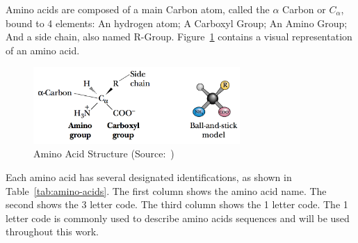 Amino acids are composed of a main Carbon atom, called the $\alpha$ Carbon
or $C_\alpha$, bound to 4 elements: An hydrogen atom; A Carboxyl Group; An
Amino Group; And a side chain, also named R-Group.
Figure~\ref{fig:amino-acid-structure} contains a visual representation of
an amino acid.

\begin{figure}
    \centering
    \includegraphics[width=0.7\textwidth]{Figuras/amino-acid.png}
    \caption{Amino Acid Structure (Source:~\cite{garrett1999biochemistry})}
    \label{fig:amino-acid-structure}
\end{figure}

Each amino acid has several designated identifications, as shown in
Table~\ref{tab:amino-acids}. The first column shows the amino acid name.
The second shows the 3 letter code. The third column shows the 1 letter code.
The 1 letter code is commonly used to describe amino acids sequences and
will be used throughout this work.

